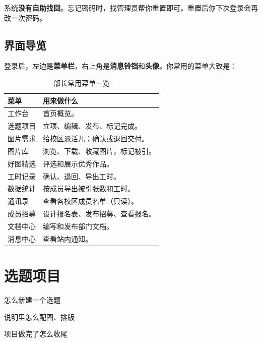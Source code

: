 \documentclass[cn,11pt,green]{elegantbook}
\begin{document}
\begin{tipbox}[忘了密码怎么办]
  系统\textbf{没有自助找回}。忘记密码时，找管理员帮你重置即可。重置后你下次登录会再改一次密码。
\end{tipbox}

\section{界面导览}

登录后，左边是\textbf{菜单栏}，右上角是\textbf{消息铃铛}和\textbf{头像}。你常用的菜单大致是：

\begin{table}[htbp]
  \centering
  \caption{部长常用菜单一览}
  \begin{tabular}{L{2.8cm} L{9.4cm}}
    \toprule
    \textbf{菜单} & \textbf{用来做什么} \\
    \midrule
    工作台 & 首页概览。 \\
    选题项目 & 立项、编辑、发布、标记完成。 \\
    图片需求 & 给校区派活儿；确认或退回交付。 \\
    图片库 & 浏览、下载、收藏图片，标记被引。 \\
    好图精选 & 评选和展示优秀作品。 \\
    工时记录 & 确认、退回、导出工时。 \\
    数据统计 & 按成员导出被引张数和工时。 \\
    通讯录 & 查看各校区成员名单（只读）。 \\
    成员招募 & 设计报名表、发布招募、查看报名。 \\
    文档中心 & 编写和发布部门文档。 \\
    消息中心 & 查看站内通知。 \\
    \bottomrule
  \end{tabular}
\end{table}

\chapter{选题项目}

\begin{introduction}
  \item 怎么新建一个选题
  \item 说明里怎么配图、排版
  \item 项目做完了怎么收尾
\end{introduction}
\end{document}
